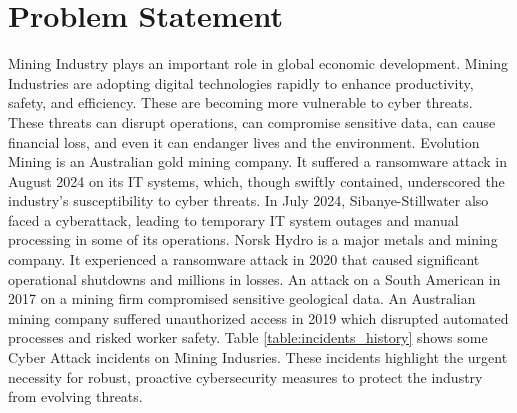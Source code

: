 \documentclass[a4paper,twoside,12pt]{report}
\begin{document}
\section{Problem Statement}
Mining Industry plays an important role in global economic development. Mining Industries are adopting digital technologies rapidly to enhance productivity, safety, and efficiency. These are becoming more vulnerable to cyber threats. These threats can disrupt operations, can compromise sensitive data, can cause financial loss, and even it can endanger lives and the environment. Evolution Mining is an Australian gold mining company. It suffered a ransomware attack in August 2024 on its IT systems, which, though swiftly contained, underscored the industry's susceptibility to cyber threats. In July 2024, Sibanye-Stillwater also faced a cyberattack, leading to temporary IT system outages and manual processing in some of its operations. Norsk Hydro is a major metals and mining company. It experienced a ransomware attack in 2020 that caused significant operational shutdowns and millions in losses.
An attack on a South American in 2017 on a mining firm compromised sensitive geological data. An Australian mining company suffered unauthorized access in 2019 which disrupted automated processes and risked worker safety. Table \ref{table:incidents_history} shows some Cyber Attack incidents on Mining Indusries.
These incidents highlight the urgent necessity for robust, proactive cybersecurity measures to protect the industry from evolving threats.
\end{document}
